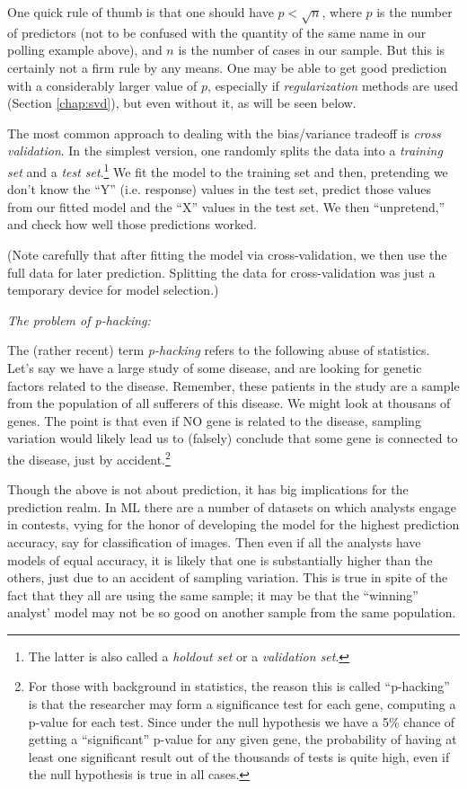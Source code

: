 One quick rule of thumb is that one should have $p < \sqrt{n}$, where
$p$ is the number of predictors (not to be confused with the quantity of
the same name in our polling example above), and $n$ is the number of
cases in our sample.  But this is certainly not a firm rule by any
means.  One may be able to get good prediction with a considerably
larger value of $p$, especially if \textit{regularization} methods are
used (Section \ref{chap:svd}), but even without it, as will be seen
below.

The most common approach to dealing with the bias/variance tradeoff is
\textit{cross validation}.  In the simplest version, one randomly splits
the data into a \textit{training set} and a \textit{test
set}.\footnote{The latter is also called a \textit{holdout set} or a
\textit{validation set}.}  We fit the model to the training set and
then, pretending we don't know the ``Y'' (i.e. response) values in the
test set, predict those values from our fitted model and the ``X''
values in the test set.  We then ``unpretend,'' and check how well those
predictions worked. 

(Note carefully that after fitting the model via cross-validation, we
then use the full data for later prediction.  Splitting the data for
cross-validation was just a temporary device for model selection.)

\textit{The problem of p-hacking:}

The (rather recent) term \textit{p-hacking} refers to the following
abuse of statistics.  Let's say we have a large study of some disease,
and are looking for genetic factors related to the disease.  Remember,
these patients in the study are a sample from the population of all
sufferers of this disease.  We might look at thousans of genes.  The
point is that even if NO gene is related to the disease, sampling
variation would likely lead us to (falsely) conclude that some gene is
connected to the disease, just by accident.\footnote{For those with
background in statistics, the reason this is called ``p-hacking'' is
that the researcher may form a significance test for each gene,
computing a p-value for each test.  Since under the null hypothesis we
have a 5\% chance of getting a ``significant'' p-value for any given
gene, the probability of having at least one significant result out of
the thousands of tests is quite high, even if the null hypothesis is
true in all cases.}

Though the above is not about prediction, it has big implications for
the prediction realm.  In ML there are a number of datasets on which
analysts engage in contests, vying for the honor of developing the model
for the highest prediction accuracy, say for classification of images.
Then even if all the analysts have models of equal accuracy, it is
likely that one is substantially higher than the others, just due to an
accident of sampling variation.  This is true in spite of the fact that
they all are using the same sample; it may be that the ``winning''
analyst' model may not be so good on another sample from the same
population.

